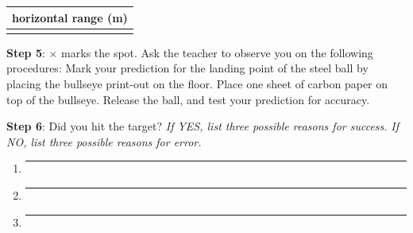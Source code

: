 \documentclass[../main-physics-problems.tex]{subfiles}
\begin{document}
\medskip

%
\hspace{5mm}
\begin{minipage}{0.25\textwidth}
\begin{center}
    \begin{tabular}{|c|}
        \hline
         \textbf{horizontal range} (m)\\
         \hline \\[1em]
         \hline
    \end{tabular}
\end{center}
\end{minipage}

\bigskip

\noindent \textbf{Step 5}: $\mathbf{\times}$ marks the spot. Ask the teacher to observe you on the following procedures: Mark your prediction for the landing point of the steel ball by placing the bullseye print-out on the floor. Place one sheet of carbon paper on top of the bullseye. Release the ball, and test your prediction for accuracy.

\bigskip

\noindent \textbf{Step 6}: Did you hit the target? \textit{If YES, list three possible reasons for success.} \textit{If NO, list three possible reasons for error.}

\begin{enumerate}[itemsep=4pt]
    \item \par\noindent\rule{0.9\textwidth}{0.4pt}
    \item \par\noindent\rule{0.9\textwidth}{0.4pt}
    \item \par\noindent\rule{0.9\textwidth}{0.4pt}
\end{enumerate}

\clearpage


\vspace*{\fill}
\begin{center}
\end{center}
\vspace*{\fill}
\end{document}
